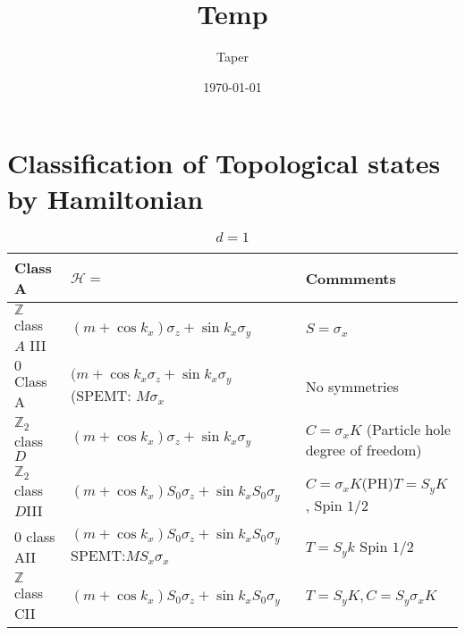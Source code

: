 \documentclass{article}
\title{Temp}
\date{\today}
\author{Taper}
\numberwithin{equation}{subsection} %
\theoremstyle{definition}
\begin{document}
\maketitle
{}
\tableofcontents
\section{Classification of Topological states by Hamiltonian}
\label{sec:Classification-of-Topological-states-by-Hamiltonian}

\begin{table}[H]
\centering
\caption{$d=1$}
\label{my-label}
\begin{tabular}{|l|l|l|}
\hline
Class A                        & $\mathcal{H}=$                                                        & Commments \\ \hline
$\mathbb{Z}$ class $A$ III     & $(m+\cos{k_x})\sigma_z+\sin{k_x} \sigma_y$                            & $S=\sigma_x$\\ \hline
$0$ Class A                    & $(m+\cos{k_x}\sigma_z+\sin{k_x}\sigma_y$(SPEMT: $M\sigma_x$           & No symmetries \\ \hline
$\mathbb{Z}_2$ class $D$       & $(m+\cos{k_x})\sigma_z + \sin{k_x}\sigma_y$                           & $C=\sigma_x K$ (Particle hole degree of freedom) \\ \hline
$\mathbb{Z}_2$ class $D$III    & $(m+\cos{k_x})S_0 \sigma_z+\sin{k_x}S_0\sigma_y$                      & $C=\sigma_x K$(PH)$T=S_y K$, Spin $1/2$\\ \hline
$0$ class AII                  & $(m+\cos{k_x})S_0 \sigma_z+\sin{k_x}S_0\sigma_y$ SPEMT:$MS_x\sigma_x$ & $T=S_yk$ Spin $1/2$ \\ \hline
$\mathbb{Z}$ class CII         & $(m+\cos{k_x})S_0 \sigma_z+\sin{k_x}S_0\sigma_y$                      & $T=S_yK, C=S_y\sigma_xK$ \\ \hline
\end{tabular}
\end{table}
\end{document}
